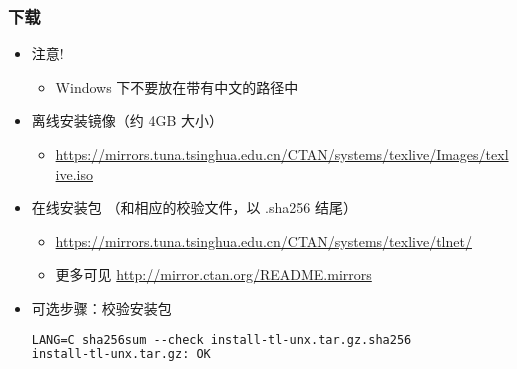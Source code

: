 \begin{frame}[fragile]
  \frametitle{下载 \TL}
  \begin{itemize}
    \item 注意!
      \begin{itemize}
        \item Windows 下不要放在带有中文的路径中
      \end{itemize}
    \item 离线安装镜像（约 4GB 大小）
      \begin{itemize}
        \item {\footnotesize
          \url{https://mirrors.tuna.tsinghua.edu.cn/CTAN/systems/texlive/Images/texlive.iso}}
      \end{itemize}
    \item 在线安装包 （和相应的校验文件，以 .sha256 结尾）
      \begin{itemize} %
        \item {\footnotesize
          \url{https://mirrors.tuna.tsinghua.edu.cn/CTAN/systems/texlive/tlnet/}
        }
        \item 更多可见 \url{http://mirror.ctan.org/README.mirrors}
      \end{itemize}

    \item 可选步骤：校验安装包
      \begin{lstlisting}[language=tex]
LANG=C sha256sum --check install-tl-unx.tar.gz.sha256
install-tl-unx.tar.gz: OK
      \end{lstlisting}

  \end{itemize}
\end{frame}

